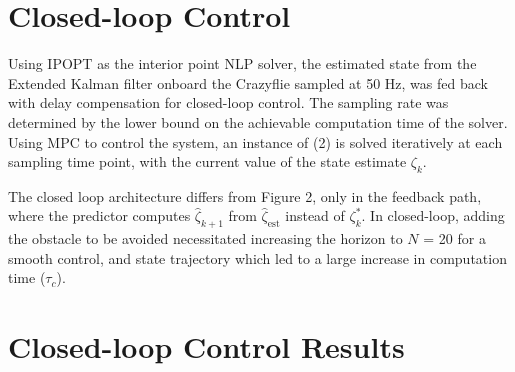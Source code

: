 \documentclass[conference]{IEEEtran}
\begin{document}


\section{Closed-loop Control }\label{Section5}
Using IPOPT \cite{wachter_implementation_2006} as the interior point NLP solver, the estimated state from the Extended Kalman filter onboard the Crazyflie sampled at 50 Hz, was fed back with delay compensation for closed-loop control. The sampling rate was determined by the lower bound on the achievable computation time of the solver. Using MPC to control the system, an instance of (2) is solved iteratively at each sampling time point, with the current value of the state estimate $\zeta_k$.

The closed loop architecture differs from Figure 2, only in the feedback path, where the predictor computes $\hat{\zeta}_{k+1}$ from $\hat{\zeta}_{\mathrm{est}}$ instead of $\zeta^*_{k}$.
In closed-loop, adding the obstacle to be avoided necessitated increasing the horizon to $N$ = 20 for a smooth control, and state trajectory which led to a large increase in computation time ($\tau_c$).

\section{Closed-loop Control Results}\label{Section6}
\end{document}
